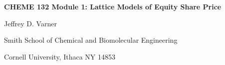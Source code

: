 \documentclass[11pt]{article}
\theoremstyle{definition}
\begin{document}
{\par\centering\textbf{\Large CHEME 132 Module 1: Lattice Models of Equity Share Price}}
\vspace{0.2in}
{\par \centering \large{Jeffrey D. Varner}}
\vspace{0.05in}
{\par \centering \large{Smith School of Chemical and Biomolecular Engineering}}
{\par \centering \large{Cornell University, Ithaca NY 14853}}

\date{}
\thispagestyle{empty}

\setcounter{page}{1}



\end{document}

